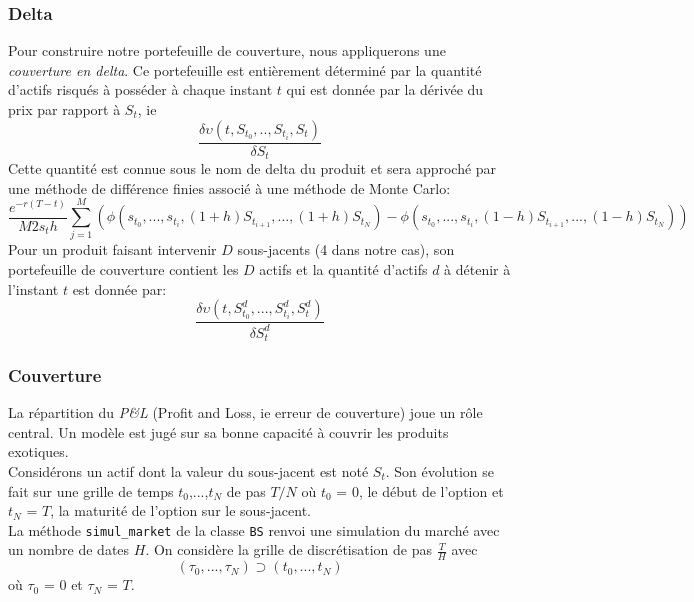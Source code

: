 \documentclass[french,12pt,a4paper]{article}
\begin{document}
\subsubsection{Delta}

Pour construire notre portefeuille de couverture, nous appliquerons une \textit{couverture en delta}. Ce portefeuille est entièrement déterminé par la quantité d'actifs risqués à posséder à chaque instant $t$ qui est donnée par la dérivée du prix par rapport à $S_{t}$, ie
$$ \frac{\delta\upsilon(t, S_{t_{0}},.., S_{t_{i}}, S_{t})}{\delta S_{t}} $$
Cette quantité est connue sous le nom de delta du produit et sera approché par une méthode de différence finies associé à une méthode de Monte Carlo:
$$ \frac{e^{-r(T-t)}}{M2s_{t}h}\sum_{j=1}^{M}(\phi(s_{t_{0}},...,s_{t_{i}},(1+h)S_{t_{i+1}},...,(1+h)S_{t_{N}})-\phi(s_{t_{0}},...,s_{t_{i}},(1-h)S_{t_{i+1}},...,(1-h)S_{t_{N}}))$$
Pour un produit faisant intervenir $D$ sous-jacents (4 dans notre cas), son portefeuille de couverture contient les $D$ actifs et la quantité d'actifs $d$ à détenir à l'instant $t$ est donnée par:
$$ \frac{\delta\upsilon(t, S_{t_{0}}^{d},...,S_{t_{i}}^{d},S_{t}^{d})}{\delta S_{t}^{d}} $$

\subsubsection{Couverture}

La répartition du \textit{P\&L} (Profit and Loss, ie erreur de couverture) joue un rôle central. Un modèle est jugé sur sa bonne capacité à couvrir les produits exotiques.\\
Considérons un actif dont la valeur du sous-jacent est noté $S_{t}$. Son évolution se fait sur une grille de temps {$t_{0}$,...,$t_{N}$} de pas $T/N$ où ${t_{0}}$ = $0$, le début de l'option et ${t_{N}}$ = $T$, la maturité de l'option sur le sous-jacent.\\
La méthode \lstinline!simul_market! de la classe \lstinline!BS! renvoi une simulation du marché avec un nombre de dates $H$. On considère la grille de discrétisation de pas $\frac{T}{H}$ avec
$$(\tau_{0},...,\tau_{N}) \supset (t_{0},...,t_{N})$$ 
où
 $\tau_{0}$ = $0$ et $\tau_{N}$ = $T$.\\
 
\end{document}
